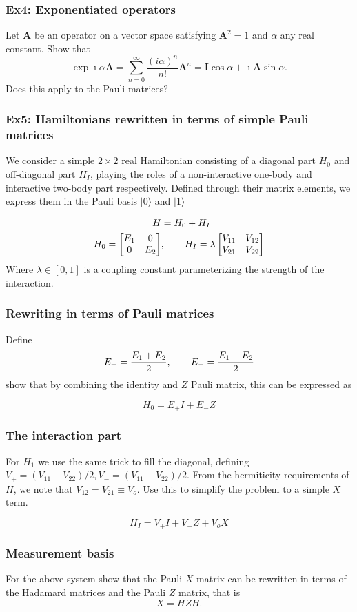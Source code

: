 \documentclass{beamer}
\begin{document}
\begin{frame}
\frametitle{Ex4: Exponentiated operators}

Let $\bm{A}$ be an operator on a vector space satisfying $\bm{A}^2=1$ and $\alpha$ any real constant. Show that
\[
\exp{\imath\alpha \bm{A}}=\sum_{n=0}^{\infty} \frac{(i\alpha)^n}{n!}\bm{A}^n=\bm{I}\cos{\alpha}+\imath\bm{A}\sin{\alpha}.
\]
Does this apply to the Pauli matrices?
\end{frame}

\begin{frame}
\frametitle{Ex5: Hamiltonians rewritten in terms of simple Pauli matrices}

We consider a simple $2\times 2$ real
Hamiltonian consisting of a diagonal part $H_0$ and off-diagonal part
$H_I$, playing the roles of a non-interactive one-body and interactive
two-body part respectively. Defined through their matrix elements, we
express them in the Pauli basis $\vert 0\rangle$ and $\vert 1 \rangle$

\begin{align*}
    \begin{split} 
        H &= H_0 + H_I \\
        H_0 = \begin{bmatrix}
            E_1 & 0 \\
            0 & E_2
        \end{bmatrix}&, \hspace{20px}
        H_I = \lambda \begin{bmatrix}
            V_{11} & V_{12} \\
            V_{21} & V_{22}
        \end{bmatrix}
    \end{split}
\end{align*}
Where $\lambda \in [0,1]$ is a coupling constant parameterizing the strength of the interaction.
\end{frame}

\begin{frame}
\frametitle{Rewriting in terms of Pauli matrices}

Define
\[
    E_{+} = \frac{E_1 + E_2}{2},\hspace{20px} E_{-} = \frac{E_1 - E_2}{2}
\]
show  that by combining the identity and $Z$ Pauli matrix, this can be expressed as

\[
    H_0 = E_{+} I + E_{-} Z
\]
\end{frame}

\begin{frame}
\frametitle{The interaction part}

For $H_1$ we use the same trick to fill the diagonal, defining $V_{+} = (V_{11} + V_{22})/2, V_{-} = (V_{11} - V_{22})/2$. From the hermiticity requirements of $H$, we note that $V_{12} = V_{21} \equiv V_o$. Use this to simplify the problem to a simple $X$ term. 

\[
    H_I = V_{+} I + V_{-} Z + V_o X
\]
\end{frame}

\begin{frame}
\frametitle{Measurement basis}

For the above system show that the Pauli $X$ matrix can be rewritten in terms of the Hadamard matrices and the Pauli $Z$ matrix, that is
\[
X=HZH.
\]
\end{frame}
\end{document}
